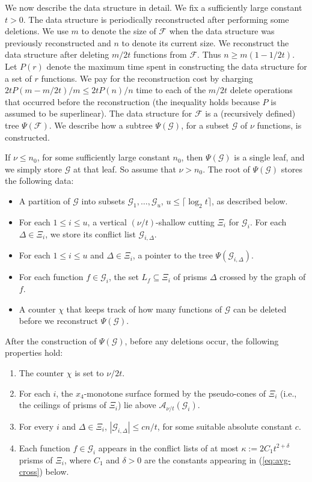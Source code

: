 \documentclass[11pt]{article}
\def\A{\mathcal{A}}
\def\F{\mathcal{F}}
\def\G{\mathcal{G}}
\def\ceil#1{\lceil #1\rceil}
\theoremstyle{definition}
\begin{document}
We now describe the data structure in detail. We fix a sufficiently large constant $t>0$.
The data structure is periodically reconstructed after performing some deletions. We use 
$m$ to denote the size of $\F$ when the data structure was previously reconstructed and $n$ 
to denote its current size. We reconstruct the data structure after deleting $m/2t$ functions 
from $\F$. Thus $n \ge m(1-1/2t)$. Let $P(r)$ denote the maximum time spent in constructing the 
data structure for a set of $r$ functions. We pay for the reconstruction cost by charging 
$2tP(m-m/2t)/m \le 2tP(n)/n$ time to each of the $m/2t$ delete operations that occurred 
before the reconstruction (the inequality holds because $P$ is assumed to be superlinear). 
The data structure for $\F$ is a (recursively defined) tree $\Psi(\F)$. We describe how a 
subtree $\Psi(\G)$, for a subset $\G$ of $\nu$ functions, is constructed.

If $\nu \le n_0$, for some sufficiently large constant $n_0$, then $\Psi(\G)$ is a single
leaf, and we simply store $\G$ at that leaf. So assume that $\nu > n_0$. The root of $\Psi(\G)$ 
stores the following data:

\medskip
\begin{itemize}
	\item A partition of $\G$ into subsets $\G_1, \ldots, \G_u$, $u \le \ceil{\log_2 t}$, 
as described below.
	\item For each $1 \le i \le u$, a vertical $(\nu/t)$-shallow cutting 
$\Xi_i$ for $\G_i$. 
For each $\Delta \in \Xi_i$, we store its conflict list $\G_{i,\Delta}$.
	\item For each $1 \le i \le u$ and $\Delta\in\Xi_i$, a pointer to the tree $\Psi(\G_{i,\Delta})$.
	\item For each function $f\in \G_i$, the set $L_f\subseteq\Xi_i$ of prisms $\Delta$
		crossed by the graph of $f$.
	\item A counter $\chi$ that keeps track of how many functions of $\G$ can be deleted before
		we reconstruct $\Psi(\G)$.
\end{itemize}

\medskip
After the construction of $\Psi(\G)$, before any deletions occur, the following properties hold:

\medskip
\begin{enumerate}[(P1)]
	\item The counter $\chi$ is set to $\nu/2t$.
	\item For each $i$, the $x_4$-monotone surface formed by the pseudo-cones of $\Xi_i$ 
(i.e., the ceilings of prisms of $\Xi_i$) lie above $\A_{\nu/t} (\G_i)$.
	\item For every $i$ and $\Delta\in \Xi_i$, $|\G_{i,\Delta}| \le cn/t$, 
for some suitable absolute constant $c$.
	\item Each function $f\in \G_i$ appears in the conflict lists of at most
    $\kappa := 2C_1t^{2+\delta}$ 
	prisms of $\Xi_i$, where $C_1$ and $\delta>0$ are the constants appearing in
		(\ref{eq:avg-cross}) below.
\end{enumerate}
\end{document}
